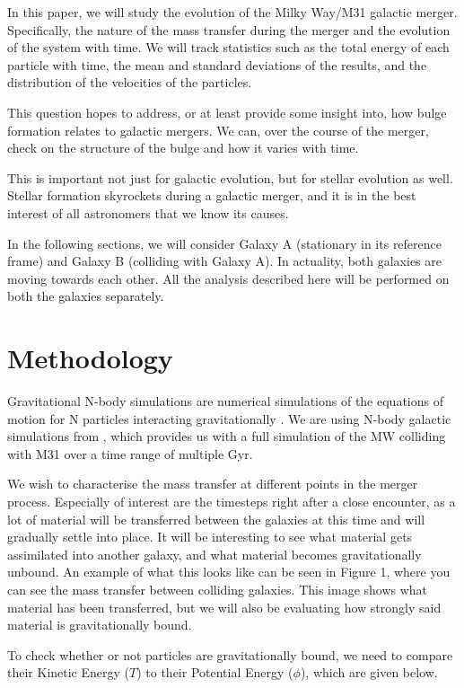 \documentclass[linenumbers, ]{aastex631}
\begin{document}
In this paper, we will study the evolution of the Milky Way/M31 galactic merger. Specifically, the nature of the mass transfer during the merger and the evolution of the system with time. We will track statistics such as the total energy of each particle with time, the mean and standard deviations of the results, and the distribution of the velocities of the particles.

This question hopes to address, or at least provide some insight into, how bulge formation relates to galactic mergers. We can, over the course of the merger, check on the structure of the bulge and how it varies with time. 

This is important not just for galactic evolution, but for stellar evolution as well. Stellar formation skyrockets during a galactic merger, and it is in the best interest of all astronomers that we know its causes.

In the following sections, we will consider Galaxy A (stationary in its reference frame) and Galaxy B (colliding with Galaxy A). In actuality, both galaxies are moving towards each other. All the analysis described here will be performed on both the galaxies separately.

\section{Methodology}

Gravitational N-body simulations are numerical simulations of the equations of motion for N particles interacting gravitationally \citep{trenti2008gravitational}. We are using N-body galactic simulations from \citep{Besla}, which provides us with a full simulation of the MW colliding with M31 over a time range of multiple Gyr. 

We wish to characterise the mass transfer at different points in the merger process. Especially of interest are the timesteps right after a close encounter, as a lot of material will be transferred between the galaxies at this time and will gradually settle into place. It will be interesting to see what material gets assimilated into another galaxy, and what material becomes gravitationally unbound. An example of what this looks like can be seen in Figure 1, where you can see the mass transfer between colliding galaxies. This image shows what material has been transferred, but we will also be evaluating how strongly said material is gravitationally bound. 


To check whether or not particles are gravitationally bound, we need to compare their Kinetic Energy ($T$) to their Potential Energy ($\phi$), which are given below.
\end{document}
